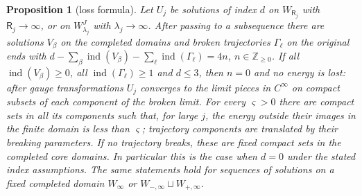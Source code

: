\documentclass[11pt]{amsart}
\newtheorem{proposition}[theorem]{Proposition}
\theoremstyle{definition}
\theoremstyle{remark}
\theoremstyle{plain}
\numberwithin{equation}{section}
\newcommand{\ZZ}{\mathbb{Z}}
\newcommand{\ind}{\operatorname{ind}}
\begin{document}
\begin{proposition}[loss formula]\label{prop:torus-loss}
Let $U_j$ be solutions of index $d$ on $W_{\mathsf R_j}$ with $\mathsf R_j\to\infty$, or on
$W^J_{\lambda_j}$ with $\lambda_j\to\infty$. After passing to a subsequence there are
solutions $V_\beta$ on the completed domains and broken trajectories $\Gamma_\ell$ on
the original ends with
$d-\sum_\beta\ind(V_\beta)-\sum_\ell\ind(\Gamma_\ell)=4n$, $n\in\ZZ_{\ge0}$. If all $\ind(V_\beta)\ge0$, all $\ind(\Gamma_\ell)\ge1$ and $d\le3$, then $n=0$ and no energy
is lost: after gauge transformations $U_j$ converges to the limit pieces in
$C^\infty$ on compact subsets of each component of the broken limit.
For every $\varsigma>0$ there are compact sets in all its components
such that, for large $j$, the energy outside their images in the
finite domain is less than $\varsigma$; trajectory components are
translated by their breaking parameters. If no trajectory breaks,
these are fixed compact sets in the completed core domains. In
particular this is the case when $d=0$ under the stated index assumptions.
The same statements hold for sequences of solutions on a fixed
completed domain $W_\infty$ or $W_{-,\infty}\sqcup W_{+,\infty}$.
\end{proposition}
\end{document}
